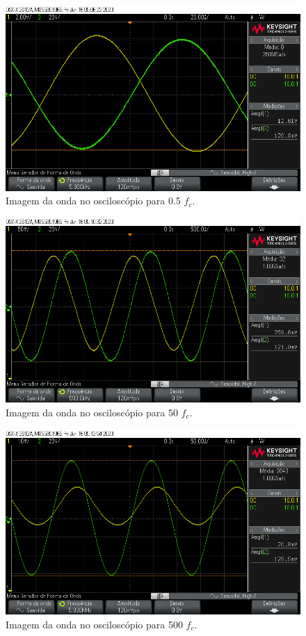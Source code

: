 \documentclass[12pt,twoside, a4paper, twocolumn]{article}
\begin{document}
\begin{figure}[h]
    \centering
    \includegraphics[width=1\columnwidth]{images/exemplo2_meio_fc.png}
    \caption{Imagem da onda no osciloscópio para 0.5 $f_c$.}
\end{figure}


\begin{figure}[h]
    \centering
    \includegraphics[width=1\columnwidth]{images/exemplo2_50_fc.png}
    \caption{Imagem da onda no osciloscópio para 50 $f_c$.}
\end{figure}


\begin{figure}[h]
    \centering
    \includegraphics[width=1\columnwidth]{images/exemplo2_500_fc.png}
    \caption{Imagem da onda no osciloscópio para 500 $f_c$.}
\end{figure}
\end{document}
